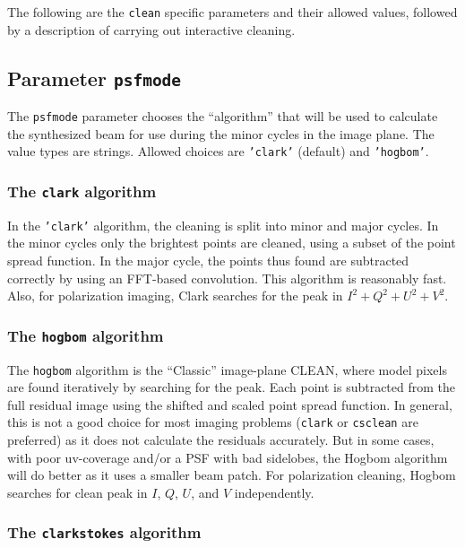 The following are the {\tt clean} specific parameters and their
allowed values, followed by a description of carrying out 
interactive cleaning.

\subsection{Parameter {\tt psfmode}}
\label{section:im.clean.psfmode}

The {\tt psfmode} parameter chooses the ``algorithm'' that will be used
to calculate the synthesized beam for use during the minor cycles in
the image plane. The value types are strings.
Allowed choices are {\tt 'clark'} (default) and {\tt 'hogbom'}. 

\subsubsection{The {\tt clark} algorithm}
\label{section:im.clean.psfmode.clark}

In the {\tt 'clark'} algorithm, the cleaning is split into minor and
major cycles. In the minor cycles only the brightest points are
cleaned, using a subset of the point spread function. In the major
cycle, the points thus found are subtracted correctly by using an
FFT-based convolution.  This algorithm is reasonably fast.
Also, for polarization imaging, Clark searches for the peak in 
$I^2+Q^2+U^2+V^2$.

\subsubsection{The {\tt hogbom} algorithm}
\label{section:im.clean.psfmode.hogbom}

The {\tt hogbom} algorithm is the ``Classic'' image-plane CLEAN, where
model pixels are found iteratively by searching for the peak. Each
point is subtracted from the full residual image using the shifted and
scaled point spread function.  In general, this is not a good choice for most
imaging problems ({\tt clark} or {\tt csclean} are preferred) as it does not
calculate the residuals accurately.  But in some cases, with poor
uv-coverage and/or a PSF with bad sidelobes, the Hogbom algorithm will
do better as it uses a smaller beam patch.  For polarization cleaning,
Hogbom searches for clean peak in $I$, $Q$, $U$, and $V$ independently.

\subsubsection{The {\tt clarkstokes} algorithm}
\label{section:im.clean.psfmode.clarkstokes}

